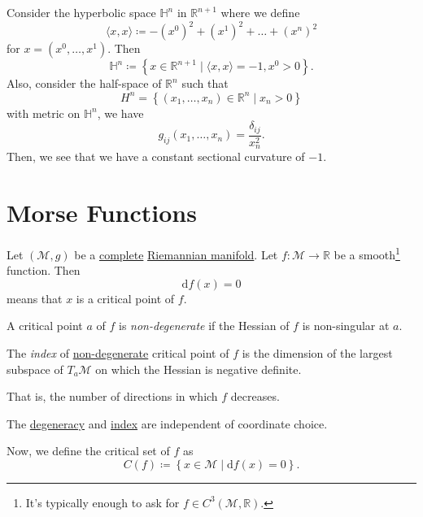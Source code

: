 Consider the hyperbolic space \(\mathbb{H} ^n\) in \(\mathbb{R} ^{n+1}\) where we define
\[
	\langle x, x \rangle \coloneqq -(x^0)^2 + (x^1)^2 + \dots + (x^n)^2
\]
for \(x=(x^0, \dots , x^1)\). Then
\[
	\mathbb{H} ^n \coloneqq \left\{ x\in \mathbb{R} ^{n+1} \mid \langle x, x \rangle = -1, x^0 > 0 \right\}.
\]
Also, consider the half-space of \(\mathbb{R} ^n\) such that
\[
	H^n = \left\{ (x_1, \dots , x_n)\in \mathbb{R} ^n \mid x_n > 0 \right\}
\]
with metric on \(\mathbb{H} ^n\), we have
\[
	g_{ij}(x_1, \dots , x_n) = \frac{\delta _{ij}}{x_n^2}.
\]
Then, we see that we have a constant sectional curvature of \(-1\).

\section{Morse Functions}
Let \((\mathcal{M} , g)\) be a \hyperref[def:geodesically-complete]{complete} \hyperref[def:Riemannian-manifold]{Riemannian manifold}. Let \(f\colon \mathcal{M} \to \mathbb{R} \) be a smooth\footnote{It's typically enough to ask for \(f\in C^3(\mathcal{M} , \mathbb{R} )\).} function. Then
\[
	\mathrm{d} f(x) = 0
\]
means that \(x\) is a critical point of \(f\).

\begin{definition}\label{def:non-degenerate}
	A critical point \(a\) of \(f\) is \emph{non-degenerate} if the Hessian of \(f\) is non-singular at \(a\).
\end{definition}

\begin{definition}\label{def:index-of-non-degenerate}
	The \emph{index} of \hyperref[def:non-degenerate]{non-degenerate} critical point of \(f\) is the dimension of the largest subspace of \(T_a \mathcal{M} \) on which the Hessian is negative definite.
\end{definition}

\begin{intuition}
	That is, the number of directions in which \(f\) decreases.
\end{intuition}

\begin{note}
	The \hyperref[def:non-degenerate]{degeneracy} and \hyperref[def:index-of-non-degenerate]{index} are independent of coordinate choice.
\end{note}

Now, we define the critical set of \(f\) as
\[
	C(f) \coloneqq \left\{ x\in \mathcal{M} \mid \mathrm{d} f(x) = 0 \right\}.
\]

